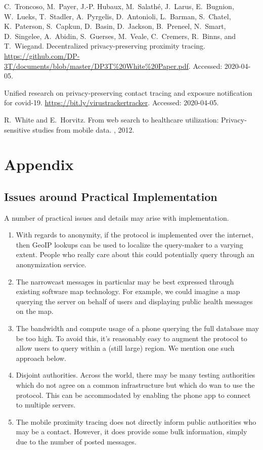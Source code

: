 \documentclass{article}
\begin{document}
\begin{thebibliography}{10}
C.~Troncoso, M.~Payer, J.-P. Hubaux, M.~Salath\'{e}, J.~Larus, E.~Bugnion,
  W.~Lueks, T.~Stadler, A.~Pyrgelis, D.~Antonioli, L.~Barman, S.~Chatel,
  K.~Paterson, S.~Capkun, D.~Basin, D.~Jackson, B.~Preneel, N.~Smart,
  D.~Singelee, A.~Abidin, S.~Guerses, M.~Veale, C.~Cremers, R.~Binns, and
  T.~Wiegand.
\newblock Decentralized privacy-preserving proximity tracing.
\newblock
  \url{https://github.com/DP-3T/documents/blob/master/DP3T\%20White\%20Paper.pdf}.
\newblock Accessed: 2020-04-05.

Unified research on privacy-preserving contact tracing and exposure
  notification for covid-19.
\newblock \url{https://bit.ly/virustrackertracker}.
\newblock Accessed: 2020-04-05.

R.~White and E.~Horvitz.
\newblock From web search to healthcare utilization: Privacy-sensitive studies
  from mobile data.
, 2012.

\end{thebibliography}


\newpage

\section*{Appendix}

\subsection{Issues around Practical Implementation}

A number of practical issues and details may arise with implementation.
\begin{enumerate}
    \item With regards to anonymity, if the protocol is implemented over the internet, then GeoIP lookups can be used to localize the query-maker to a varying extent.  People who really care about this could potentially query through an anonymization service.
    \item The narrowcast messages in particular may be best expressed through existing software map technology.   For example, we could imagine a map querying the server on behalf of users and displaying public health messages on the map.  
    \item The bandwidth and compute usage of a phone querying the full database may be too high.  To avoid this, it's reasonably easy to augment the protocol to allow users to query within a (still large) region.  We mention one such approach below.  
    \item Disjoint authorities.  Across the world, there may be many testing authorities which do not agree on a common infrastructure but which do wan to use the protocol.  This can be accommodated by enabling the phone app to connect to multiple servers. 
    \item The mobile proximity tracing does not directly inform public authorities who may be a contact.  However, it does provide some bulk information, simply due to the number of posted messages. 
\end{enumerate}
\end{document}
